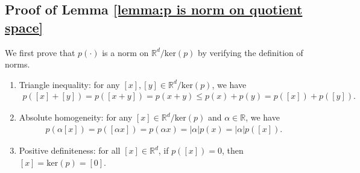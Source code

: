 \documentclass[11 pt]{article}
\begin{document}
	\subsection{Proof of Lemma \ref{lemma:p is norm on quotient space}}\label{ap:quotient_space}
	We first prove that $p(\cdot)$ is a norm on $\mathbb{R}^d/\text{ker}(p)$ by verifying the definition of norms.
	\begin{enumerate}[(1)]
		\item  Triangle inequality: for any $[x], [y] \in \mathbb{R}^d/\text{ker}(p)$, we have
		\begin{align*}
			p([x] + [y]) = p([x+y]) = p(x + y) \leq p(x) + p(y) = p([x]) + p([y]).    
		\end{align*}
		\item Absolute homogeneity: for any $[x] \in \mathbb{R}^d/\text{ker}(p)$ and $\alpha \in \mathbb{R}$, we have
		\begin{align*}
			p(\alpha [x]) = p([\alpha x]) = p(\alpha x) = |\alpha| p(x) = |\alpha| p([x]).    
		\end{align*}
		\item Positive definiteness: for all $[x] \in \mathbb{R}^d$, if $p([x]) = 0$, then $[x] = \text{ker}(p) = [0]$.    
	\end{enumerate}
	
\end{document}
